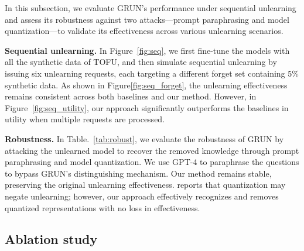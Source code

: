 \begin{table}[t]
    \centering
    \caption{Unlearning effectiveness under attacks}
  \label{tab:robust}
\end{table}

In this subsection, we evaluate GRUN’s performance under sequential unlearning and assess its robustness against two attacks—prompt paraphrasing and model quantization—to validate its effectiveness across various unlearning scenarios.

\noindent\textbf{Sequential unlearning.} In Figure~\ref{fig:seq}, {we first fine-tune the models with all the synthetic data of TOFU, and then simulate sequential unlearning by issuing six unlearning requests, each targeting a different forget set containing 5\% synthetic data.} As shown in Figure\ref{fig:seq_forget}, the unlearning effectiveness remains consistent across both baselines and our method. However, in Figure~\ref{fig:seq_utility}, our approach significantly outperforms the baselines in utility when multiple requests are processed.

\noindent\textbf{Robustness.} In Table.~\ref{tab:robust}, we evaluate the robustness of GRUN by attacking the unlearned model to recover the removed knowledge through prompt paraphrasing and model quantization. We use GPT-4 to paraphrase the questions to bypass GRUN’s distinguishing mechanism. Our method remains stable, preserving the original unlearning effectiveness. \citet{zhang2024catastrophic} reports that quantization may negate unlearning; however, our approach effectively recognizes and removes quantized representations with no loss in effectiveness.

\subsection{Ablation study}
\label{exp:abla}

